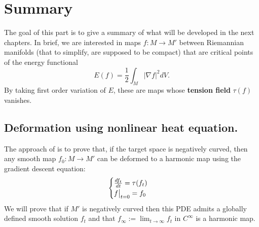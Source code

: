 \iffalse
\begin{info}
The PDF version of this page can be downloaded by replacing \texttt{html} in the its address by
\texttt{pdf}. 
For example \texttt{/html/sheaf-cohomology.html} should become \texttt{/pdf/sheaf-cohomology.pdf}.
\end{info}
\fi

\iffalse
Here is the \href{../Stage 2018/main.pdf}{memoire}.
\fi

\section{Summary}
\label{sec:org7287a1a}

The goal of this part is to give a summary of what will be developed in the next chapters. In brief, we are interested in
maps \(f: M \longrightarrow M'\) between Riemannian manifolds (that to simplify, are
supposed to be compact) that are critical points of the energy functional
\[
 E(f) = \frac{1}{2}\int_M |\nabla f|^2 dV.
\]
By taking first order variation of \(E\), these are maps whose \textbf{tension field} \(\tau(f)\) vanishes. 


\subsection{Deformation using nonlinear heat equation.}
\label{sec:org9617dcd}

The approach of \cite{eells_harmonic_1964} is to prove that, if the target space is
negatively curved, then any smooth map \(f_0: M \longrightarrow M'\) can be deformed to a
harmonic map using the gradient descent equation:
\begin{equation}
\label{eq:intro:1}
\begin{cases}
\frac{df_t}{dt} = \tau(f_t)\\
\restr{f}{t=0} = f_0
\end{cases}
\end{equation}
We will prove that if \(M'\) is negatively curved then this PDE admits a globally defined smooth
solution \(f_t\) and that \(f_{\infty}:=\lim_{t\to \infty} f_t\) in \(C^\infty\) is
a harmonic map.

